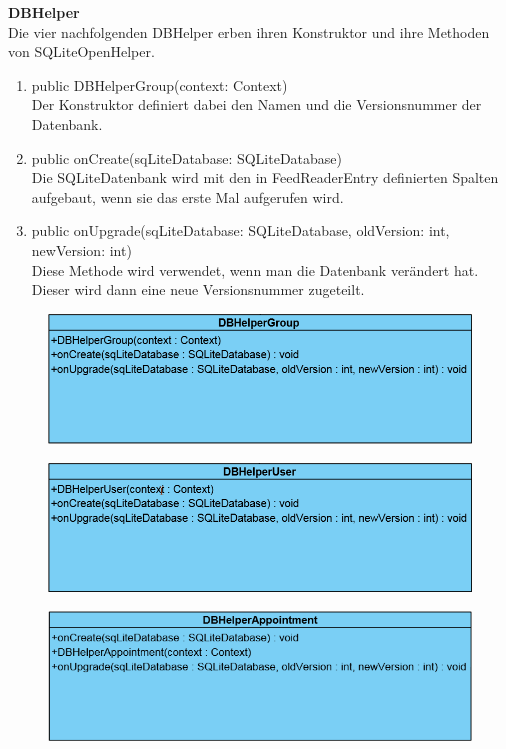 \textbf{DBHelper}\\
Die vier nachfolgenden DBHelper erben ihren Konstruktor und ihre Methoden von SQLiteOpenHelper. 
\begin{enumerate}
	\item public DBHelperGroup(context: Context)\\
		Der Konstruktor definiert dabei den Namen und die Versionsnummer der Datenbank.
	\item public onCreate(sqLiteDatabase: SQLiteDatabase)\\
		Die SQLiteDatenbank wird mit den in FeedReaderEntry definierten Spalten aufgebaut, wenn sie das erste Mal aufgerufen wird.
	\item public onUpgrade(sqLiteDatabase: SQLiteDatabase, oldVersion: int, newVersion: int)\\
		Diese Methode wird verwendet, wenn man die Datenbank verändert hat. Dieser wird dann eine neue Versionsnummer zugeteilt.	
\end{enumerate}
\begin{figure}[H]
	\includegraphics[scale = .5]{res/umlClasses/DBHelperGroup.png}
	\centering	
\end{figure}

\begin{figure}[H]
	\includegraphics[scale = .5]{res/umlClasses/DBHelperUser.png}
	\centering
\end{figure}

\begin{figure}[H]
	\includegraphics[scale = .58]{res/umlClasses/DBHelperAppointment.png}
	\centering
\end{figure}

